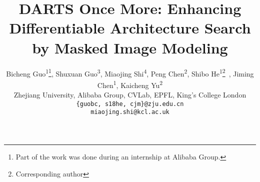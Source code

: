 \documentclass[10pt,twocolumn,letterpaper]{article}
\begin{document}
\title{ DARTS Once More: Enhancing Differentiable Architecture Search \\
by Masked Image Modeling}

\author{Bicheng Guo\textsuperscript{1}\thanks{Part of the work was done during an internship at Alibaba Group.}, Shuxuan Guo\textsuperscript{3}, Miaojing Shi\textsuperscript{4}, Peng Chen\textsuperscript{2}, Shibo He\textsuperscript{1}\thanks{Corresponding author}~, Jiming Chen\textsuperscript{1}, Kaicheng Yu\textsuperscript{2}
\\
Zhejiang University, Alibaba Group, CVLab, EPFL,  King's College London
\\
{\tt \small \{guobc, s18he, cjm\}@zju.edu.cn} \\
{\tt \small miaojing.shi@kcl.ac.uk}  }

\maketitle
\end{document}
